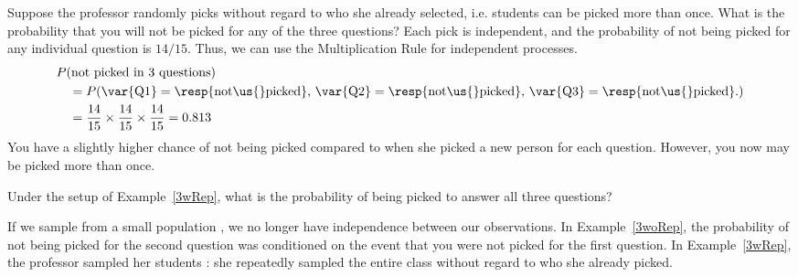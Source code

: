 \D{\newpage}

\begin{examplewrap}
\begin{nexample}{Suppose the professor randomly picks without regard to who she already selected, i.e. students can be picked more than once. What is the probability that you will not be picked for any of the three questions?}\label{3wRep}
Each pick is independent, and the probability of not being picked for any individual question is $14/15$. Thus, we can use the Multiplication Rule for independent processes.
\begin{align*}
&P(\text{not picked in 3 questions}) \\
&\quad = P(\text{\var{Q1}} = \text{\resp{not\us{}picked}, }\text{\var{Q2}} = \text{\resp{not\us{}picked}, }\text{\var{Q3}} = \text{\resp{not\us{}picked}.}) \\
&\quad = \frac{14}{15}\times\frac{14}{15}\times\frac{14}{15} = 0.813
\end{align*}
You have a slightly higher chance of not being picked compared to when she picked a new person for each question. However, you now may be picked more than once.
\end{nexample}
\end{examplewrap}

\begin{exercisewrap}
\begin{nexercise}
Under the setup of Example~\ref{3wRep}, what is the probability of being picked to answer all three questions?\footnotemark
\end{nexercise}
\end{exercisewrap}

If we sample from a small population , we no longer have independence between our observations. In Example~\ref{3woRep}, the probability of not being picked for the second question was conditioned on the event that you were not picked for the first question. In Example~\ref{3wRep}, the professor sampled her students : she repeatedly sampled the entire class without regard to who she already picked. 


